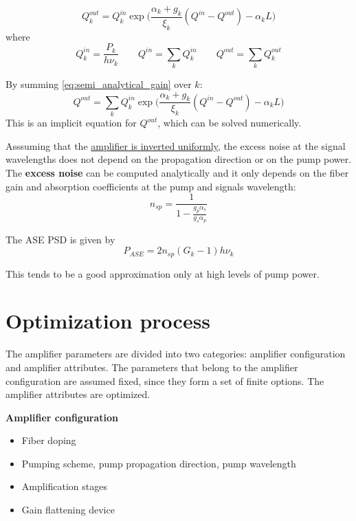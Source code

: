 \documentclass[a4paper]{article}
\begin{document}
\begin{equation} \label{eq:semi_analytical_gain}
	Q^{out}_k = Q^{in}_k\exp\Big(\frac{\alpha_k + g_k}{\xi_k}(Q^{in} - Q^{out}) - \alpha_kL\Big)
\end{equation}
where
\begin{equation}
	Q^{in}_k = \frac{P_k}{h\nu_k}\qquad Q^{in} = \sum_k Q^{in}_k \qquad Q^{out} = \sum_k Q^{out}_k
\end{equation}

By summing \eqref{eq:semi_analytical_gain} over $k$:
\begin{equation}
Q^{out} = \sum_kQ^{in}_k\exp\Big(\frac{\alpha_k + g_k}{\xi_k}(Q^{in} - Q^{out}) - \alpha_kL\Big)
\end{equation}
This is an implicit equation for $Q^{out}$, which can be solved numerically. 

Asssuming that the \underline{amplifier is inverted uniformly}, the excess noise at the signal wavelengths does not depend on the propagation direction or on the pump power. The \textbf{excess noise} can be computed analytically and it only depends on the fiber gain and absorption coefficients at the pump and signals wavelength:
\begin{equation}
	n_{sp} = \frac{1}{1 - \displaystyle\frac{g_p\alpha_s}{g_s\alpha_p}}
\end{equation}

The ASE PSD is given by
\begin{equation}
	P_{ASE} = 2n_{sp}(G_k-1)h\nu_k
\end{equation}

This tends to be a good approximation only at high levels of pump power.

\section{Optimization process}

The amplifier parameters are divided into two categories: amplifier configuration and amplifier attributes. The parameters that belong to the amplifier configuration are assumed fixed, since they form a set of finite options. The amplifier attributes are optimized.

\noindent\textbf{Amplifier configuration}
\begin{itemize}
	\item Fiber doping
	\item Pumping scheme, pump propagation direction, pump wavelength
	\item Amplification stages
	\item Gain flattening device
\end{itemize}
\end{document}
